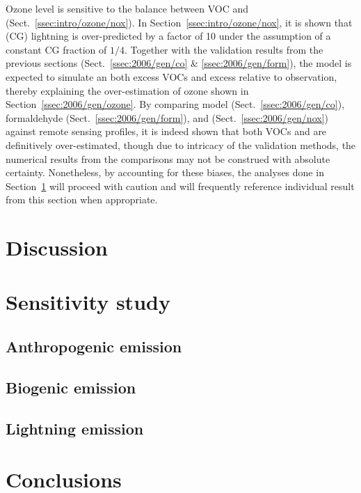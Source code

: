 \vspace{1.2in}

\noindent Ozone level is sensitive to the balance between VOC and  (Sect.~\ref{ssec:intro/ozone/nox}). In Section~\ref{ssec:intro/ozone/nox}, it is shown that (CG) lightning is
over-predicted by a factor of 10 under the assumption of a constant CG fraction of $1/4$. Together with the validation results from the previous sections (Sect.~\ref{ssec:2006/gen/co} \&
\ref{ssec:2006/gen/form}), the model is expected to simulate an both excess VOCs and excess  relative to observation, thereby explaining the over-estimation of ozone shown in
Section~\ref{ssec:2006/gen/ozone}. By comparing model  (Sect.~\ref{ssec:2006/gen/co}), formaldehyde (Sect.~\ref{ssec:2006/gen/form}), and  (Sect.~\ref{ssec:2006/gen/nox})
against remote sensing profiles, it is indeed shown that both VOCs and  are definitively over-estimated, though due to intricacy of the validation methods, the numerical results
from the comparisons may not be construed with absolute certainty. Nonetheless,  by accounting for these biases, the analyses done in Section~\ref{sec:2006/discussion} will proceed with caution
and will frequently reference individual result from this section when appropriate.

\section{Discussion}\label{sec:2006/discussion}

\section{Sensitivity study}\label{sec:2006/sens}
\subsection{Anthropogenic emission}\label{ssec:2006/sens/anthrop}
\subsection{Biogenic emission}\label{ssec:2006/sens/bio}
\subsection{Lightning emission}\label{ssec:2006/sens/lnox}

\section{Conclusions}\label{sec:2006/conslusion}